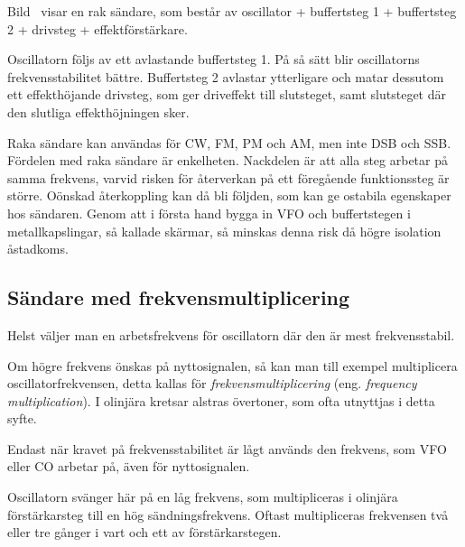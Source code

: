 Bild~ visar en rak sändare, som består av oscillator +
buffertsteg 1 + buffertsteg 2 + drivsteg + effektförstärkare.

Oscillatorn följs av ett avlastande buffertsteg 1.
På så sätt blir oscillatorns frekvensstabilitet bättre.
Buffertsteg 2 avlastar ytterligare och matar dessutom ett effekthöjande
drivsteg, som ger driveffekt till slutsteget, samt slutsteget där den slutliga
effekthöjningen sker.

Raka sändare kan användas för CW, FM, PM och AM, men inte DSB och SSB.
Fördelen med raka sändare är enkelheten.
Nackdelen är att alla steg arbetar på samma frekvens, varvid risken för
återverkan på ett föregående funktionssteg är större.
Oönskad återkoppling kan då bli följden, som kan ge ostabila egenskaper hos
sändaren.
Genom att i första hand bygga in VFO och buffertstegen i metallkapslingar,
så kallade skärmar, så minskas denna risk då högre isolation åstadkoms.

\subsection{Sändare med frekvensmultiplicering}

Helst väljer man en arbetsfrekvens för oscillatorn där den är mest
frekvensstabil.

Om högre frekvens önskas på nyttosignalen, så kan man
till exempel multiplicera oscillatorfrekvensen, detta kallas för
\emph{frekvensmultiplicering} (eng. \emph{frequency multiplication}).
I olinjära kretsar alstras övertoner, som ofta utnyttjas i detta syfte.

Endast när kravet på frekvensstabilitet är lågt används den frekvens,
som VFO eller CO arbetar på, även för nyttosignalen.


Oscillatorn svänger här på en låg frekvens, som multipliceras i
olinjära förstärkarsteg till en hög sändningsfrekvens.
Oftast multipliceras frekvensen två eller tre gånger i vart och ett av
förstärkarstegen.

